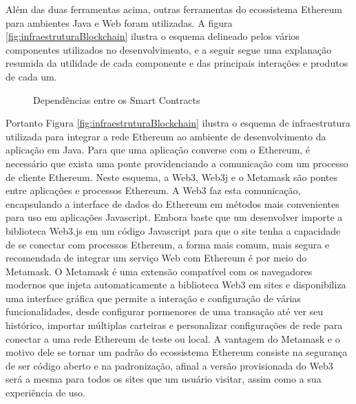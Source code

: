 \documentclass[a4paper,11pt]{article}
\begin{document}
Além das duas ferramentas acima, outras ferramentas do ecossistema Ethereum para ambientes Java e Web foram utilizadas.
A figura \ref{fig:infraestruturaBlockchain} ilustra o esquema delineado pelos vários componentes utilizados no desenvolvimento, e a seguir segue uma explanação resumida da utilidade de cada componente e das principais interações e produtos de cada um.


\begin{figure}[!h]
  \centering
  
  \caption{Dependências entre os Smart Contracts}
  \label{fig:dependenciasSmartContracts}
\end{figure}

Portanto Figura \ref{fig:infraestruturaBlockchain} ilustra o esquema de infraestrutura utilizada para integrar a rede Ethereum ao ambiente de desenvolvimento da aplicação em Java.
Para que uma aplicação converse com o Ethereum, é necessário que exista uma ponte providenciando a comunicação com um processo de cliente Ethereum.
Neste esquema, a Web3, Web3j e o Metamask são pontes entre aplicações e processos Ethereum.
A Web3 faz esta comunicação, encapsulando a interface de dados do Ethereum em métodos mais convenientes para uso em aplicações Javascript.
Embora baste que um desenvolver importe a biblioteca Web3.js em um código Javascript para que o site tenha a capacidade de se conectar com processos Ethereum, a forma mais comum, mais segura e recomendada de integrar um serviço Web com Ethereum é por meio do Metamask.
O Metamask é uma extensão compatível com os navegadores modernos que injeta automaticamente a biblioteca Web3 em sites e disponibiliza uma interface gráfica que permite a interação e configuração de várias funcionalidades, desde configurar pormenores de uma transação até ver seu histórico, importar múltiplas carteiras e personalizar configurações de rede para conectar a uma rede Ethereum de teste ou local.
A vantagem do Metamask e o motivo dele se tornar um padrão do ecossistema Ethereum consiste na segurança de ser código aberto e na padronização, afinal a versão provisionada do Web3 será a mesma para todos os sites que um usuário visitar, assim como a sua experiência de uso. %
\end{document}
